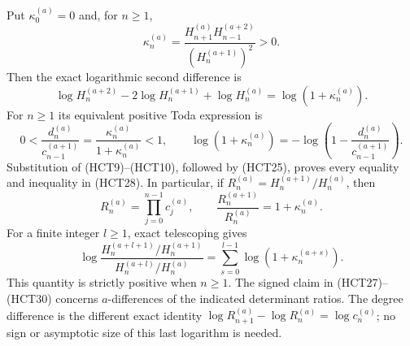 Put $\kappa_0^{(a)}=0$ and, for $n\geq1$,
\begin{equation}\tag{HCT26}
 \kappa_n^{(a)}=
 \frac{H_{n+1}^{(a)}H_{n-1}^{(a+2)}}{(H_n^{(a+1)})^2}>0.
\end{equation}
Then the exact logarithmic second difference is
\begin{equation}\tag{HCT27}
 \log H_n^{(a+2)}-2\log H_n^{(a+1)}+\log H_n^{(a)}
 =\log(1+\kappa_n^{(a)}).
\end{equation}
For $n\geq1$ its equivalent positive Toda expression is
\begin{equation}\tag{HCT28}
 0<\frac{d_n^{(a)}}{c_{n-1}^{(a+1)}}
 =\frac{\kappa_n^{(a)}}{1+\kappa_n^{(a)}}<1,\qquad
 \log(1+\kappa_n^{(a)})
 =-\log\left(1-\frac{d_n^{(a)}}{c_{n-1}^{(a+1)}}\right).
\end{equation}
Substitution of (HCT9)--(HCT10), followed by (HCT25), proves
every equality and inequality in (HCT28).
In particular, if $R_n^{(a)}=H_n^{(a+1)}/H_n^{(a)}$, then
\begin{equation}\tag{HCT29}
 R_n^{(a)}=\prod_{j=0}^{n-1}c_j^{(a)},\qquad
 \frac{R_n^{(a+1)}}{R_n^{(a)}}=1+\kappa_n^{(a)}.
\end{equation}
For a finite integer $l\geq1$, exact telescoping gives
\begin{equation}\tag{HCT30}
 \log\frac{H_n^{(a+l+1)}/H_n^{(a+1)}}
 {H_n^{(a+l)}/H_n^{(a)}}
 =\sum_{s=0}^{l-1}\log(1+\kappa_n^{(a+s)}).
\end{equation}
This quantity is strictly positive when $n\geq1$.
The signed claim in (HCT27)--(HCT30) concerns $a$-differences
of the indicated determinant ratios. The degree difference is
the different exact identity
$\log R_{n+1}^{(a)}-\log R_n^{(a)}=\log c_n^{(a)}$;
no sign or asymptotic size of this last logarithm is needed.

